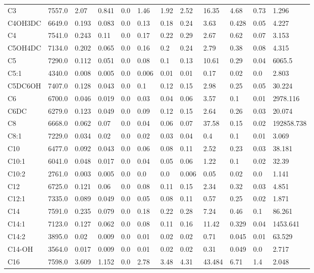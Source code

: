 \begin{tabular}{llllllllllll}
C3 & 7557.0 & 2.07 & 0.841 & 0.0 & 1.46 & 1.92 & 2.52 & 16.35 & 4.68 & 0.73 & 1.296 \\
C4OH\C3DC & 6649.0 & 0.193 & 0.083 & 0.0 & 0.13 & 0.18 & 0.24 & 3.63 & 0.428 & 0.05 & 4.227 \\
C4 & 7541.0 & 0.243 & 0.11 & 0.0 & 0.17 & 0.22 & 0.29 & 2.67 & 0.62 & 0.07 & 3.153 \\
C5OH\C4DC & 7134.0 & 0.202 & 0.065 & 0.0 & 0.16 & 0.2 & 0.24 & 2.79 & 0.38 & 0.08 & 4.315 \\
C5 & 7290.0 & 0.112 & 0.051 & 0.0 & 0.08 & 0.1 & 0.13 & 10.61 & 0.29 & 0.04 & 6065.5 \\
C5:1 & 4340.0 & 0.008 & 0.005 & 0.0 & 0.006 & 0.01 & 0.01 & 0.17 & 0.02 & 0.0 & 2.803 \\
C5DC\C6OH & 7407.0 & 0.128 & 0.043 & 0.0 & 0.1 & 0.12 & 0.15 & 2.98 & 0.25 & 0.05 & 30.224 \\
C6 & 6700.0 & 0.046 & 0.019 & 0.0 & 0.03 & 0.04 & 0.06 & 3.57 & 0.1 & 0.01 & 2978.116 \\
C6DC & 6279.0 & 0.123 & 0.049 & 0.0 & 0.09 & 0.12 & 0.15 & 2.64 & 0.26 & 0.03 & 20.074 \\
C8 & 6668.0 & 0.062 & 0.07 & 0.0 & 0.04 & 0.06 & 0.07 & 37.58 & 0.15 & 0.02 & 192858.738 \\
C8:1 & 7229.0 & 0.034 & 0.02 & 0.0 & 0.02 & 0.03 & 0.04 & 0.4 & 0.1 & 0.01 & 3.069 \\
C10 & 6477.0 & 0.092 & 0.043 & 0.0 & 0.06 & 0.08 & 0.11 & 2.52 & 0.23 & 0.03 & 38.181 \\
C10:1 & 6041.0 & 0.048 & 0.017 & 0.0 & 0.04 & 0.05 & 0.06 & 1.22 & 0.1 & 0.02 & 32.39 \\
C10:2 & 2761.0 & 0.003 & 0.005 & 0.0 & 0.0 & 0.0 & 0.006 & 0.05 & 0.02 & 0.0 & 1.141 \\
C12 & 6725.0 & 0.121 & 0.06 & 0.0 & 0.08 & 0.11 & 0.15 & 2.34 & 0.32 & 0.03 & 4.851 \\
C12:1 & 7335.0 & 0.089 & 0.049 & 0.0 & 0.05 & 0.08 & 0.11 & 0.57 & 0.25 & 0.02 & 1.871 \\
C14 & 7591.0 & 0.235 & 0.079 & 0.0 & 0.18 & 0.22 & 0.28 & 7.24 & 0.46 & 0.1 & 86.261 \\
C14:1 & 7123.0 & 0.127 & 0.062 & 0.0 & 0.08 & 0.11 & 0.16 & 11.42 & 0.329 & 0.04 & 1453.641 \\
C14:2 & 3895.0 & 0.02 & 0.009 & 0.0 & 0.01 & 0.02 & 0.02 & 0.71 & 0.045 & 0.01 & 63.529 \\
C14-OH & 3564.0 & 0.017 & 0.009 & 0.0 & 0.01 & 0.02 & 0.02 & 0.31 & 0.049 & 0.0 & 2.717 \\
C16 & 7598.0 & 3.609 & 1.152 & 0.0 & 2.78 & 3.48 & 4.31 & 43.484 & 6.71 & 1.4 & 2.048 \\

\end{tabular}
